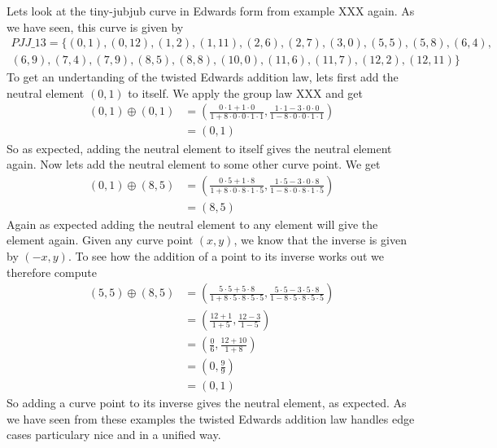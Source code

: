 \begin{example} Lets look at the tiny-jubjub curve in Edwards form from example XXX again. As we have seen, this curve is given by
\begin{multline*}
\mathit{PJJ\_13} = \{(0, 1),(0, 12),(1, 2),(1, 11),(2, 6),(2, 7),(3, 0),(5, 5),(5, 8),(6, 4),\\
(6, 9),(7, 4),(7, 9),(8, 5),(8, 8),(10, 0),(11, 6),(11, 7),(12, 2),(12, 11)\}
\end{multline*}
To get an undertanding of the twisted Edwards addition law, lets first add the neutral element $(0,1)$ to itself. We apply the group law XXX and get
\begin{align*}
(0, 1) \oplus (0, 1) &= \left(\frac{0\cdot 1+1 \cdot 0}{1 +8\cdot0\cdot 0\cdot 1\cdot 1},\frac{1\cdot 1-3\cdot 0\cdot 0}{1-8\cdot 0\cdot 0\cdot 1\cdot 1}\right)\\
                     & = (0,1)
\end{align*}
So as expected, adding the neutral element to itself gives the neutral element again. Now lets add the neutral element to some other curve point. We get
\begin{align*}
(0, 1) \oplus (8, 5) &= \left(\frac{0\cdot 5+1 \cdot 8}{1 +8\cdot0\cdot 8\cdot 1\cdot 5},\frac{1\cdot 5 - 3\cdot 0\cdot 8}{1-8\cdot 0\cdot 8\cdot 1\cdot 5}\right)\\
                     & = (8,5)
\end{align*}
Again as expected adding the neutral element to any element will give the element again. Given any curve point $(x,y)$, we know that the inverse is given by $(-x,y)$. To see how the addition of a point to its inverse works out we therefore compute
\begin{align*}
(5, 5) \oplus (8, 5) &= \left(\frac{5\cdot 5+5 \cdot 8}{1 +8\cdot 5\cdot 8\cdot 5\cdot 5},\frac{5\cdot 5 - 3\cdot 5\cdot 8}{1-8\cdot 5\cdot 8\cdot 5\cdot 5}\right)\\
                     &= \left(\frac{12+1}{1 +5},\frac{12 - 3}{1-5}\right)\\
                     &= \left(\frac{0}{6},\frac{12 + 10}{1+8}\right)\\
                     &= \left(0,\frac{9}{9}\right)\\
                     &=  (0,1)
\end{align*}
So adding a curve point to its inverse gives the neutral element, as expected. As we have seen from these examples the twisted Edwards addition law handles edge cases particulary nice and in a unified way.
\end{example}

